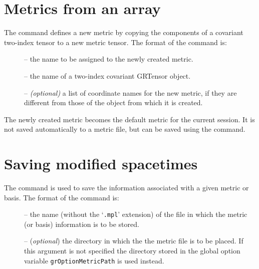 \documentclass{article}
\begin{document}
\section{Metrics from an array} \label{sec:grnewmetric}
%
The  command defines a new metric by copying the components
of a covariant two-index tensor to a new metric tensor. The format of the 
command is:\\
%
\begin{cmdspec}
  \label{spec:grnewmetric}

  \begin{description}
    \item[] -- the name to be assigned to the newly created
      metric.
    \item[] -- the name of a two-index covariant GRTensor
      object.
    \item[] -- \textit{(optional)} a list of coordinate names
      for the new metric, if they are different from those of the object from
      which it is created.
  \end{description}

\end{cmdspec}

The newly created metric becomes the default metric for the current
session. It is not saved automatically to a metric file, but can be saved
using the  command.
%
\section{Saving modified spacetimes} \label{sec:grsaveg}
%
The  command is used to save the information associated with
a given metric or basis. The format of the command is:\\
%
\begin{cmdspec}
  \label{spec:grsaveg}

  \begin{description}
    \item[] -- the name (without the `\texttt{.mpl}' extension)
      of the file in which the metric (or basis) information is to be stored.
    \item[] -- (\textit{optional}) the directory in which
      the the metric file is to be placed. If this argument is not specified
      the directory stored in the global option variable
      \texttt{grOptionMetricPath} is used instead.
  \end{description}

\end{cmdspec}
\end{document}
